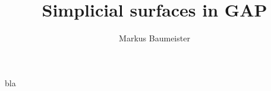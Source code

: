 \documentclass{scrartcl}
\author{Markus Baumeister}
\title{Simplicial surfaces in GAP}
\begin{document}
\maketitle

bla
\end{document}

